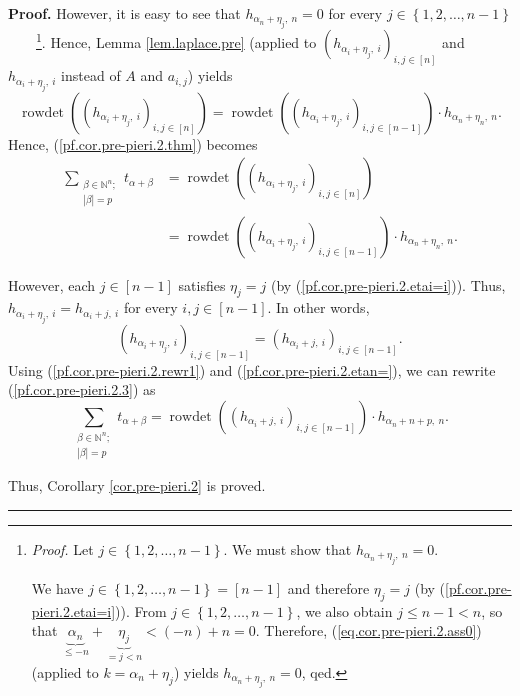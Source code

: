 \documentclass[numbers=enddot,12pt,final,onecolumn,notitlepage,english]{scrartcl}%
\theoremstyle{definition}
\newenvironment{proof}[1][Proof]{\noindent\textbf{#1.} }{\ \rule{0.5em}{0.5em}}
\let\sumnonlimits\sum
\renewcommand{\sum}{\sumnonlimits\limits}
\newenvironment{verlong}{}{}
\begin{document}
\begin{proof}
\begin{verlong}
However, it is easy to see that $h_{\alpha_{n}+\eta_{j},\ n}=0$ for every
$j\in\left\{  1,2,\ldots,n-1\right\}  $\ \ \ \ \footnote{\textit{Proof.} Let
$j\in\left\{  1,2,\ldots,n-1\right\}  $. We must show that $h_{\alpha_{n}%
+\eta_{j},\ n}=0$.
\par
We have $j\in\left\{  1,2,\ldots,n-1\right\}  =\left[  n-1\right]  $ and
therefore $\eta_{j}=j$ (by (\ref{pf.cor.pre-pieri.2.etai=i})). From
$j\in\left\{  1,2,\ldots,n-1\right\}  $, we also obtain $j\leq n-1<n$, so that
$\underbrace{\alpha_{n}}_{\leq-n}+\underbrace{\eta_{j}}_{=j<n}<\left(
-n\right)  +n=0$. Therefore, (\ref{eq.cor.pre-pieri.2.ass0}) (applied to
$k=\alpha_{n}+\eta_{j}$) yields $h_{\alpha_{n}+\eta_{j},\ n}=0$, qed.}. Hence,
Lemma \ref{lem.laplace.pre} (applied to $\left(  h_{\alpha_{i}+\eta_{j}%
,\ i}\right)  _{i,j\in\left[  n\right]  }$ and $h_{\alpha_{i}+\eta_{j},\ i}$
instead of $A$ and $a_{i,j}$) yields%
\[
\operatorname*{rowdet}\left(  \left(  h_{\alpha_{i}+\eta_{j},\ i}\right)
_{i,j\in\left[  n\right]  }\right)  =\operatorname*{rowdet}\left(  \left(
h_{\alpha_{i}+\eta_{j},\ i}\right)  _{i,j\in\left[  n-1\right]  }\right)
\cdot h_{\alpha_{n}+\eta_{n},\ n}.
\]
Hence, (\ref{pf.cor.pre-pieri.2.thm}) becomes%
\begin{align}
\sum_{\substack{\beta\in\mathbb{N}^{n};\\\left\vert \beta\right\vert
=p}}t_{\alpha+\beta}  &  =\operatorname*{rowdet}\left(  \left(  h_{\alpha
_{i}+\eta_{j},\ i}\right)  _{i,j\in\left[  n\right]  }\right) \nonumber\\
&  =\operatorname*{rowdet}\left(  \left(  h_{\alpha_{i}+\eta_{j},\ i}\right)
_{i,j\in\left[  n-1\right]  }\right)  \cdot h_{\alpha_{n}+\eta_{n},\ n}.
\label{pf.cor.pre-pieri.2.3}%
\end{align}


However, each $j\in\left[  n-1\right]  $ satisfies $\eta_{j}=j$ (by
(\ref{pf.cor.pre-pieri.2.etai=i})). Thus, $h_{\alpha_{i}+\eta_{j}%
,\ i}=h_{\alpha_{i}+j,\ i}$ for every $i,j\in\left[  n-1\right]  $. In other
words,
\begin{equation}
\left(  h_{\alpha_{i}+\eta_{j},\ i}\right)  _{i,j\in\left[  n-1\right]
}=\left(  h_{\alpha_{i}+j,\ i}\right)  _{i,j\in\left[  n-1\right]  }.
\label{pf.cor.pre-pieri.2.rewr1}%
\end{equation}
Using (\ref{pf.cor.pre-pieri.2.rewr1}) and (\ref{pf.cor.pre-pieri.2.etan=}),
we can rewrite (\ref{pf.cor.pre-pieri.2.3}) as
\[
\sum_{\substack{\beta\in\mathbb{N}^{n};\\\left\vert \beta\right\vert
=p}}t_{\alpha+\beta}=\operatorname*{rowdet}\left(  \left(  h_{\alpha
_{i}+j,\ i}\right)  _{i,j\in\left[  n-1\right]  }\right)  \cdot h_{\alpha
_{n}+n+p,\ n}.
\]

\end{verlong}

\noindent Thus, Corollary \ref{cor.pre-pieri.2} is proved.
\end{proof}
\end{document}
